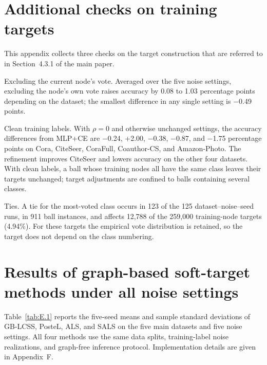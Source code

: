 \documentclass[10pt,letterpaper,nopreprintline]{elsarticle}
\begin{document}
\FloatBarrier

\setcounter{table}{0}

\section{Additional checks on training targets}\label{sec:D}

This appendix collects three checks on the target construction that are referred to in Section~4.3.1 of the main paper.

Excluding the current node's vote. Averaged over the five noise settings, excluding the node's own vote raises accuracy by 0.08 to 1.03 percentage points depending on the dataset; the smallest difference in any single setting is \ensuremath{-}0.49 points.

Clean training labels. With \(\rho=0\) and otherwise unchanged settings, the accuracy differences from MLP+CE are \ensuremath{-}0.24, +2.00, \ensuremath{-}0.38, \ensuremath{-}0.87, and \ensuremath{-}1.75 percentage points on Cora, CiteSeer, CoraFull, Coauthor-CS, and Amazon-Photo. The refinement improves CiteSeer and lowers accuracy on the other four datasets. With clean labels, a ball whose training nodes all have the same class leaves their targets unchanged; target adjustments are confined to balls containing several classes.

Ties. A tie for the most-voted class occurs in 123 of the 125 dataset--noise--seed runs, in 911 ball instances, and affects 12,788 of the 259,000 training-node targets (4.94\%). For these targets the empirical vote distribution is retained, so the target does not depend on the class numbering.

\FloatBarrier

\setcounter{table}{0}

\section{Results of graph-based soft-target methods under all noise settings}\label{sec:E}

Table~\ref{tab:E.1} reports the five-seed means and sample standard deviations of GB-LCSS, PosteL, ALS, and SALS on the five main datasets and five noise settings. All four methods use the same data splits, training-label noise realizations, and graph-free inference protocol. Implementation details are given in Appendix~F.



\FloatBarrier
\end{document}
